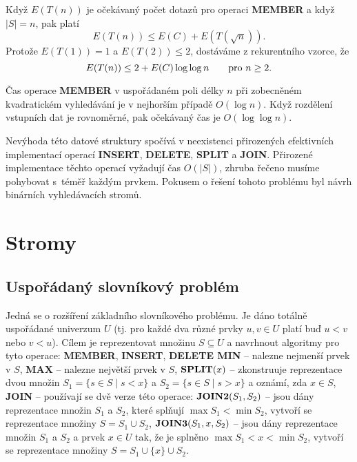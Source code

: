 \documentclass[a4paper,12pt]{article}
\begin{document}
Když $E(T(n))$ je očekávaný počet dotazů pro operaci 
{\bf MEMBER} a když $|S|=n$, pak platí 
$$E(T(n))\le E(C)+E(T(\sqrt n)).$$
Protože $E(T(1))=1$ a $E(T(2))\le 2$, dostáváme z rekurentního 
vzorce, že 
$$E(T(n))\le 2+E(C)\log\log n\qquad\text{\rm pro }n\ge 2.$$

\begin{veta}Čas operace {\bf MEMBER} v uspořádaném poli délky $
n$ při 
zobec\-něném kvadra\-tickém vyhledávání je v nejhorším 
přípa\-dě $O(\log n)$. Když rozdělení vstupních dat je 
rovno\-měr\-né, pak očekávaný čas je $O(\log\log n)$. 
\end{veta}

Nevýhoda této datové struktury 
spočívá v neexistenci přiroze\-ných efektivních implementací 
ope\-rací {\bf INSERT}, {\bf DELETE}, {\bf SPLIT} a {\bf JOIN}. Přirozené 
implementace těchto ope\-rací vyža\-dují čas 
$O(|S|)$, zhruba řečeno musíme pohybovat s~téměř kaž\-dým prvkem. 
Pokusem o řešení 
tohoto problému byl návrh binár\-ních vyhledávacích 
stromů.

\section{Stromy}

\subsection{Uspořádaný slovníkový problém}

Jedná se o rozšíření základního slovníkového problému. Je 
dáno totálně uspořádané univerzum $U$ (tj. pro každé dva 
různé prvky $u,v\in U$ platí buď $u<v$ nebo $v<
u$). Cílem 
je reprezentovat 
množinu $S\subseteq U$ a navrhnout algoritmy pro tyto operace:\newline 
{\bf MEMBER}, {\bf INSERT}, {\bf DELETE\newline 
MIN} -- nalezne nejmenší prvek v $S$,\newline 
{\bf MAX} -- nalezne největší prvek v $S$,\newline 
$\bold S\bold P\bold L\bold I\bold T(x)$ -- zkonstruuje reprezentace dvou množin 
$S_1=\{s\in S\mid s<x\}$ a $S_2=\{s\in S\mid s>x\}$ a oznámí, zda 
$x\in S$,\newline 
{\bf JOIN} -- používají se dvě verze této operace:\newline 
$\bold J\bold O\bold I\bold N\bold 2(S_1,S_2)$ -- jsou dány reprezentace množin $
S_1$ a $S_2$, které 
splňují $\max S_1<\min S_2$, vytvoří se reprezentace množiny 
$S=S_1\cup S_2$,\newline 
$\bold J\bold O\bold I\bold N\bold 3(S_1,x,S_2)$ -- jsou dány reprezentace množin $
S_1$ a $S_2$ a 
prvek $x\in U$ tak, že je splněno $\max S_1<x<\min S_2$, vytvoří 
se reprezentace množiny $S=S_1\cup \{x\}\cup S_2$.
\end{document}
